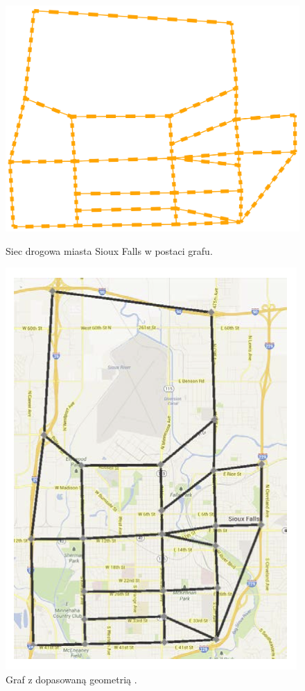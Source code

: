 \documentclass[twoside,12pt]{report}
\begin{document}
\vspace*{50px}
\begin{figure}[h]
\begin{flushleft}
\begin{minipage}[b]{.47\textwidth}
	\centering
	\includegraphics[width=.9\linewidth]{img/graf}
	\caption{Siec drogowa miasta Sioux Falls w postaci grafu.}
\end{minipage}%
\end{flushleft}
\begin{flushright}
	\begin{minipage}[b]{.47\textwidth}
	\centering
	\includegraphics[width=.9\linewidth]{img/dopasowanie}
	\caption{Graf z dopasowaną geometrią \cite{siux}.}
	\end{minipage}
\end{flushright}
\end{figure}
\end{document}
